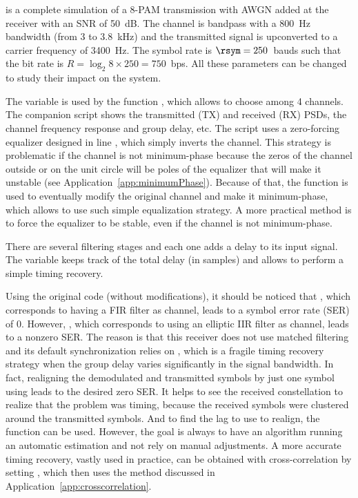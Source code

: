  is a complete simulation of a 8-PAM transmission with AWGN added at the receiver with an SNR of 50~dB. The channel is bandpass with a 800~Hz bandwidth (from 3 to 3.8~kHz) and the transmitted signal is upconverted to a carrier frequency of 3400~Hz. The symbol rate is $\rsym=250$~bauds such that the bit rate is $R=\log_2 8 \times 250 = 750$~bps. All these parameters can be changed to study their impact on the system.



The variable  is used by the function , which allows to choose among 4 channels. The companion script  shows the transmitted (TX) and received (RX) PSDs, the channel frequency response and group delay, etc. The script uses a zero-forcing equalizer designed in line , which simply inverts the channel. This strategy is problematic if the channel is not minimum-phase because the zeros of the channel outside or on the unit circle will be poles of the equalizer that will make it unstable (see Application~\ref{app:minimumPhase}). Because of that, the function  is used to eventually modify the original channel and make it minimum-phase, which allows to use such simple equalization strategy. A more practical method is to force the equalizer to be stable, even if the channel is not minimum-phase.

There are several filtering stages and each one adds a delay to its input signal. The variable  keeps track of the total delay (in samples) and allows to perform a simple timing recovery.

Using the original code (without modifications), it should be noticed that , which corresponds to having a FIR filter as channel, leads to a symbol error rate (SER) of 0. However, , which corresponds to using an elliptic IIR filter as channel, leads to a nonzero SER. The reason is that this receiver does not use matched filtering and its default synchronization relies on , which is a fragile timing recovery strategy when the group delay varies significantly in the signal bandwidth. In fact, realigning the demodulated and transmitted symbols by just one symbol using
leads to the desired zero SER. It helps to see the received constellation to realize that the problem was timing, because the received symbols were clustered around the transmitted symbols. And to find the lag to use to realign, the  function can be used. However, the goal is always to have an algorithm running an automatic estimation and not rely on manual adjustments.
A more accurate timing recovery, vastly used in practice, can be obtained with cross-correlation by setting , which then uses the method discussed in Application~\ref{app:crosscorrelation}.

